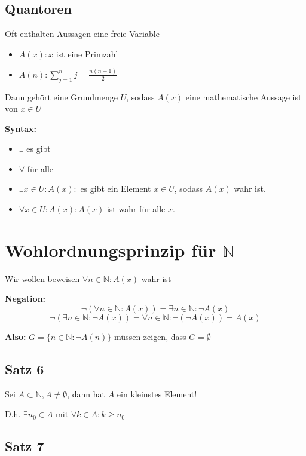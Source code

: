 \documentclass[fleqn]{scrbook}
\newcommand{\N}{\mathbb{N}}
\newenvironment{example}{{\bfseries Beispiel }}{}
\begin{document}
\subsection{Quantoren}

Oft enthalten Aussagen eine freie Variable

\begin{example}
\begin{itemize}
  \item $A(x):x$ ist eine Primzahl
  \item $A(n): \sum_{j=1}^n j=\frac{n(n+1)}{2}$
\end{itemize}
\end{example}

Dann gehört eine Grundmenge $U$, sodass $A(x)$ eine mathematische Aussage ist von $x \in U$

\textbf{Syntax:}

\begin{itemize}
  \item $\exists$ es gibt
  \item $\forall$ für alle
  \item $\exists x \in U:A(x):$ es gibt ein Element $x \in U$, sodass $A(x)$ wahr ist.
  \item $\forall x \in U:A(x): A(x)$ ist wahr für alle $x$.
\end{itemize}


\section{Wohlordnungsprinzip für \texorpdfstring{$\N$}{N}}


Wir wollen beweisen $\forall n \in \N: A(x)$ wahr ist

\textbf{Negation:}
\[\lnot(\forall n \in \N: A(x))=\exists n \in \N: \lnot A(x)\]
\[\lnot(\exists n \in \N: \lnot A(x))=\forall n \in \N: \lnot(\lnot A(x)) = A(x)\]

\textbf{Also:} $G=\{n\in \N: \lnot A(n)\}$ müssen zeigen, dass $G=\emptyset$

\subsection{Satz 6}

Sei $A \subset \N, A \neq \emptyset$, dann hat $A$ ein kleinstes Element!

D.h. $\exists n_0 \in A$ mit $\forall k \in A: k \geq n_0$

\subsection{Satz 7}
\end{document}
